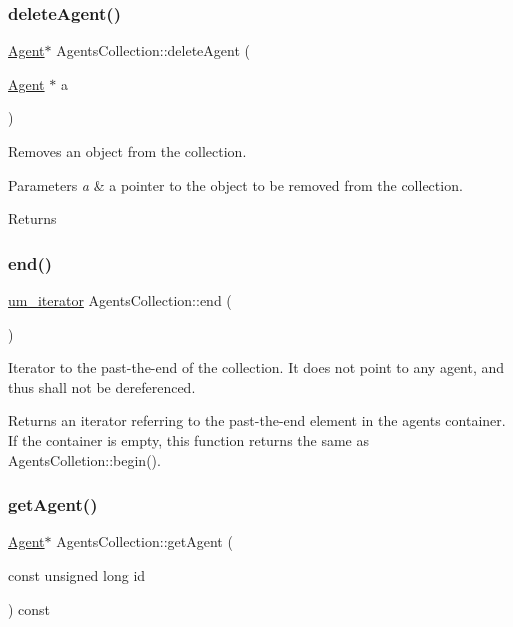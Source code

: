 \subsubsection{\texorpdfstring{deleteAgent()}{deleteAgent()}}
{\footnotesize\ttfamily \mbox{\hyperlink{class_agent}{Agent}}$\ast$ Agents\+Collection\+::delete\+Agent (\begin{DoxyParamCaption}\item[{\mbox{\hyperlink{class_agent}{Agent}} $\ast$}]{a }\end{DoxyParamCaption})}

Removes an object from the collection. 
\begin{DoxyParams}{Parameters}
{\em a} & a pointer to the object to be removed from the collection. \\
\hline
\end{DoxyParams}
\begin{DoxyReturn}{Returns}

\end{DoxyReturn}
\mbox{\label{class_agents_collection_afc61b751cf3387ab4a1bf0dfbc29cb82}} 
\subsubsection{\texorpdfstring{end()}{end()}}
{\footnotesize\ttfamily \mbox{\hyperlink{_agents_collection_8h_afde47bc45d604b8b8c72755072376679}{um\+\_\+iterator}} Agents\+Collection\+::end (\begin{DoxyParamCaption}{ }\end{DoxyParamCaption})}

Iterator to the past-\/the-\/end of the collection. It does not point to any agent, and thus shall not be dereferenced. \begin{DoxyReturn}{Returns}
an iterator referring to the past-\/the-\/end element in the agents container. If the container is empty, this function returns the same as Agents\+Colletion\+::begin(). 
\end{DoxyReturn}
\mbox{\label{class_agents_collection_a4b6b57c50d715edb3404520cfdb32688}} 
\subsubsection{\texorpdfstring{getAgent()}{getAgent()}}
{\footnotesize\ttfamily \mbox{\hyperlink{class_agent}{Agent}}$\ast$ Agents\+Collection\+::get\+Agent (\begin{DoxyParamCaption}\item[{const unsigned long}]{id }\end{DoxyParamCaption}) const}

